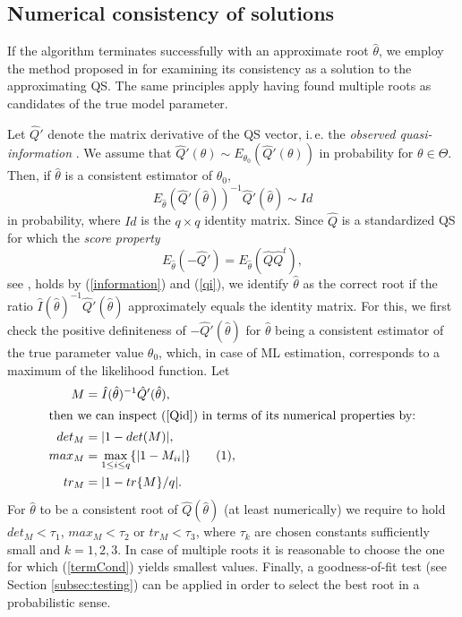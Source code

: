 \documentclass[article, nojss]{jss}
\numberwithin{equation}{section}			%
\newcommand\numberthis{\addtocounter{equation}{1}\tag{\theequation}}
\begin{document}
\subsection{Numerical consistency of solutions}\label{subsec:check}
If the algorithm terminates successfully with an approximate root $\hat{\theta}$,
we employ the method proposed in \citet[sect.~13.3.3]{ref:Heyde1997} for
examining its consistency as a solution to the approximating QS. The
same principles apply having found multiple roots as candidates of the true
model parameter.\par
%
Let $\hat{Q}'$ denote the matrix derivative of the QS vector, i.\,e.
the \emph{observed quasi-information} \citep[see][sect.~13.2]{ref:Heyde1997}. We
assume that $\hat{Q}'(\theta)\sim E_{\theta_0}(\hat{Q}'(\theta))$ in probability
for $\theta\in\Theta$. Then, if $\hat{\theta}$ is a consistent estimator of
$\theta_0$,
\begin{equation}\label{Qid} 
   E_{\hat{\theta}}(\hat{Q}'(\hat{\theta}))^{-1}\hat{Q}'(\hat{\theta})\sim Id
\end{equation}
in probability, where $Id$ is the $q\times q$ identity matrix. Since $\hat{Q}$
is a standardized QS for which the \emph{score property}
\begin{equation} 
  E_{\hat{\theta}}(-\hat{Q}') = E_{\hat{\theta}}(\hat{Q}\hat{Q}^t),
\end{equation}
see \citet[sect.~13.3.1]{ref:Heyde1997}, holds by (\ref{information}) and
(\ref{qi}), we identify $\hat{\theta}$ as the correct root if the ratio
$\hat{I}(\hat{\theta})^{-1}\hat{Q}'(\hat{\theta})$
approximately equals the identity matrix. For this, we first check the positive
definiteness of $-\hat{Q}'(\hat{\theta})$ for $\hat{\theta}$ being a consistent
estimator of the true parameter value $\theta_0$, which, in case of ML
estimation, corresponds to a maximum of the likelihood function. Let
\begin{align*}
  M &= \hat{I}(\hat{\theta})^{-1}\hat{Q}'(\hat{\theta}),\\
 \intertext{then we can inspect (\ref{Qid}) in terms of its numerical
 properties by:} det_M  &= |1-det(M)|,\\
  max_{M} &= \max_{1\leq i \leq q}\{|1-M_{ii}|\}\numberthis
  \label{termCond},\\
  tr_{M} &= |1-tr\{M\}/q|.
\end{align*}
For $\hat{\theta}$ to be a consistent root of $\hat{Q}(\hat{\theta})$ (at least
numerically) we require to hold $det_M<\tau_1$, $max_M<\tau_2$ or $tr_M<\tau_3$,
where $\tau_k$ are chosen constants sufficiently small and $k=1,2,3$. In case
of multiple roots it is reasonable to choose the one for which (\ref{termCond})
yields smallest values. Finally, a goodness-of-fit test (see Section
\ref{subsec:testing}) can be applied in order to select the best root in a
probabilistic sense.
%
\end{document}
